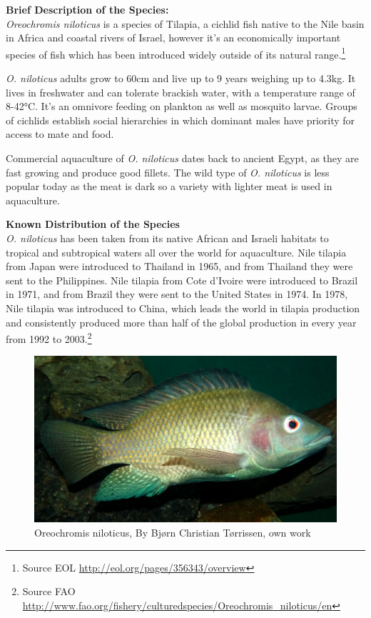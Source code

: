 \documentclass[openany]{book}
\let\rmarkdownfootnote\footnote%
\def\footnote{\protect\rmarkdownfootnote}
\theoremstyle{definition}
\theoremstyle{definition}
\theoremstyle{definition}
\theoremstyle{remark}
\begin{document}
\textbf{Brief Description of the Species:}\\
\emph{Oreochromis niloticus} is a species of Tilapia, a cichlid fish
native to the Nile basin in Africa and coastal rivers of Israel, however
it's an economically important species of fish which has been introduced
widely outside of its natural range.\footnote{Source EOL
  \url{http://eol.org/pages/356343/overview}}

\emph{O. niloticus} adults grow to 60cm and live up to 9 years weighing
up to 4.3kg. It lives in freshwater and can tolerate brackish water,
with a temperature range of 8-42°C. It's an omnivore feeding on plankton
as well as mosquito larvae. Groups of cichlids establish social
hierarchies in which dominant males have priority for access to mate and
food.

Commercial aquaculture of \emph{O. niloticus} dates back to ancient
Egypt, as they are fast growing and produce good fillets. The wild type
of \emph{O. niloticus} is less popular today as the meat is dark so a
variety with lighter meat is used in aquaculture.

\textbf{Known Distribution of the Species}\\
\emph{O. niloticus} has been taken from its native African and Israeli
habitats to tropical and subtropical waters all over the world for
aquaculture. Nile tilapia from Japan were introduced to Thailand in
1965, and from Thailand they were sent to the Philippines. Nile tilapia
from Cote d'Ivoire were introduced to Brazil in 1971, and from Brazil
they were sent to the United States in 1974. In 1978, Nile tilapia was
introduced to China, which leads the world in tilapia production and
consistently produced more than half of the global production in every
year from 1992 to 2003.\footnote{Source FAO
  \url{http://www.fao.org/fishery/culturedspecies/Oreochromis_niloticus/en}}

\begin{figure}

{\centering \includegraphics[width=0.7\linewidth]{images_species/Oreochromis-niloticus-Nairobi} 

}

\caption{Oreochromis niloticus, By Bjørn Christian Tørrissen, own work}\label{fig:unnamed-chunk-7}
\end{figure}
\end{document}
